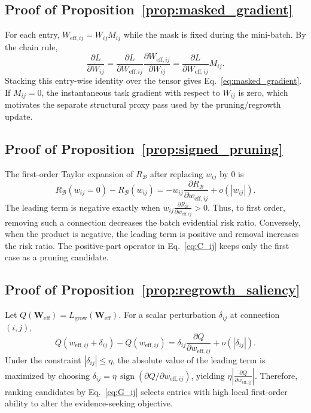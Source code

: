 \documentclass[letterpaper]{article} %
\begin{document}
\subsection{Proof of Proposition~\ref{prop:masked_gradient}}
For each entry, $W_{\text{eff},ij}=W_{ij}M_{ij}$ while the mask is fixed during the mini-batch. By the chain rule,
\begin{equation}
    \frac{\partial L}{\partial W_{ij}}
    =
    \frac{\partial L}{\partial W_{\text{eff},ij}}
    \frac{\partial W_{\text{eff},ij}}{\partial W_{ij}}
    =
    \frac{\partial L}{\partial W_{\text{eff},ij}}M_{ij}.
\end{equation}
Stacking this entry-wise identity over the tensor gives Eq.~\ref{eq:masked_gradient}. If $M_{ij}=0$, the instantaneous task gradient with respect to $W_{ij}$ is zero, which motivates the separate structural proxy pass used by the pruning/regrowth update.

\subsection{Proof of Proposition~\ref{prop:signed_pruning}}
The first-order Taylor expansion of $R_{\mathcal B}$ after replacing $w_{ij}$ by $0$ is
\begin{equation}
    R_{\mathcal B}(w_{ij}=0)-R_{\mathcal B}(w_{ij})
    =
    -w_{ij}\frac{\partial R_{\mathcal B}}{\partial w_{\text{eff},ij}}
    + o(|w_{ij}|).
\end{equation}
The leading term is negative exactly when $w_{ij}\frac{\partial R_{\mathcal B}}{\partial w_{\text{eff},ij}}>0$. Thus, to first order, removing such a connection decreases the batch evidential risk ratio. Conversely, when the product is negative, the leading term is positive and removal increases the risk ratio. The positive-part operator in Eq.~\ref{eq:C_ij} keeps only the first case as a pruning candidate.

\subsection{Proof of Proposition~\ref{prop:regrowth_saliency}}
Let $Q(\bm{W}_{\text{eff}})=L_{\text{grow}}(\bm{W}_{\text{eff}})$. For a scalar perturbation $\delta_{ij}$ at connection $(i,j)$,
\begin{equation}
    Q(w_{\text{eff},ij}+\delta_{ij})-Q(w_{\text{eff},ij})
    =
    \delta_{ij}\frac{\partial Q}{\partial w_{\text{eff},ij}}
    + o(|\delta_{ij}|).
\end{equation}
Under the constraint $|\delta_{ij}|\le\eta$, the absolute value of the leading term is maximized by choosing $\delta_{ij}=\eta\,\operatorname{sign}(\partial Q/\partial w_{\text{eff},ij})$, yielding $\eta\left|\frac{\partial Q}{\partial w_{\text{eff},ij}}\right|$. Therefore, ranking candidates by Eq.~\ref{eq:G_ij} selects entries with high local first-order ability to alter the evidence-seeking objective.
\end{document}
